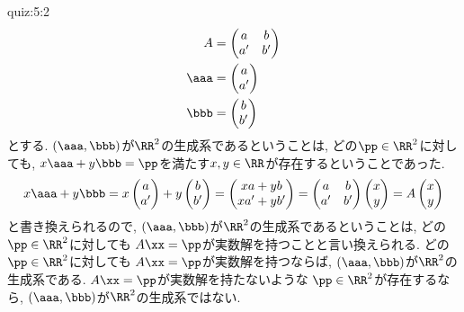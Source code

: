 \begin{answerof}{quiz:5:2}
  \begin{align*}
    A&=\begin{pmatrix}a&b\\a'&b'\end{pmatrix}\\
    \aaa&=\begin{pmatrix}a\\a'\end{pmatrix}\\
    \bbb&=\begin{pmatrix}b\\b'\end{pmatrix}
  \end{align*}
  とする.
  $(\aaa,\bbb)$が$\RR^2$の生成系であるということは,
  どの$\pp\in\RR^2$に対しても,
  $x\aaa+y\bbb=\pp$を満たす$x,y\in\RR$が存在するということであった.
  \begin{align*}
    x\aaa+y\bbb=
    x\begin{pmatrix}a\\a'\end{pmatrix}+y\begin{pmatrix}b\\b'\end{pmatrix}
    =\begin{pmatrix}xa+yb\\xa'+yb'\end{pmatrix}
    =\begin{pmatrix}a&b\\a'&b'\end{pmatrix}\begin{pmatrix}x\\y\end{pmatrix}
    =A\begin{pmatrix}x\\y\end{pmatrix}
  \end{align*}
  と書き換えられるので,
  $(\aaa,\bbb)$が$\RR^2$の生成系であるということは,
  どの$\pp\in\RR^2$に対しても
  $A\xx=\pp$が実数解を持つことと言い換えられる.
  どの$\pp\in\RR^2$に対しても
  $A\xx=\pp$が実数解を持つならば,
  $(\aaa,\bbb)$が$\RR^2$の生成系である. 
  $A\xx=\pp$が実数解を持たないような
  $\pp\in\RR^2$が存在するなら,
  $(\aaa,\bbb)$が$\RR^2$の生成系ではない.
 


\end{answerof}
